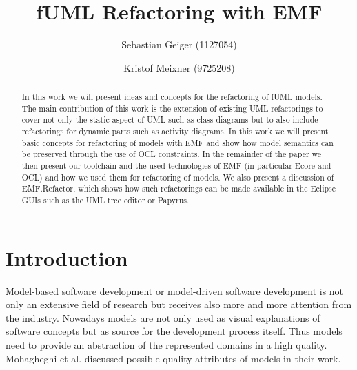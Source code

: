 \documentclass{llncs}
\begin{document}
\pagestyle{plain}

\title{fUML Refactoring with EMF}


\author{Sebastian Geiger (1127054) \and Kristof Meixner (9725208)}
\maketitle

\begin{abstract}
In this work we will present ideas and concepts for the refactoring of fUML models. The main contribution of this work is 
the extension of existing UML refactorings to cover not only the static aspect of UML such as class diagrams but to also 
include refactorings for dynamic
parts such as activity diagrams. In this work we will present basic concepts for refactoring of models with EMF and show how model semantics can be
preserved through the use of OCL constraints. In the remainder of the paper we then present our toolchain and the used technologies
of EMF (in particular Ecore and OCL) and how we used them for refactoring of models. We also present a discussion of EMF.Refactor, which shows how such refactorings
can be made available in the Eclipse GUIs such as the UML tree editor or Papyrus.
\end{abstract}

\tableofcontents
\newpage


\section{Introduction}

Model-based software development or model-driven software development is not only an extensive field of research but
receives also more and more attention from the industry. Nowadays models are not only used as visual explanations of
software concepts but as source for the development process itself. Thus models need to provide an abstraction of
the represented domains in a high quality. Mohagheghi et al. \cite{DBLP:journals/infsof/MohagheghiDN09} discussed possible 
quality attributes of models in their work.
\end{document}
